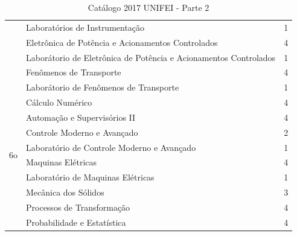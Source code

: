 \documentclass[12pt]{article} %
\begin{document}
\begin{table}[H]
\begin{tabular}{|c|l|c|}
				    & Laboratórios de Instrumentação               							& 1        \\ \cline{2-3}  
					& Eletrônica de Potência e Acionamentos Controlados   			& 4        \\ \cline{2-3} 
                      & Laborátorio de Eletrônica de Potência e Acionamentos Controlados  & 1        \\ \cline{2-3} 
                      & Fenômenos de Transporte                                    & 4        \\ \cline{2-3} 
                      & Laborátorio de Fenômenos de Transporte                                   & 1        \\ \cline{2-3} 
					& Cálculo Numérico                                                & 4        \\ \hline
\multirow{6}{*}{6o} 
				   & Automação e Supervisórios II                         & 4        \\ \cline{2-3} 
                     & Controle Moderno e Avançado                           & 2        \\ \cline{2-3} 
                     & Laboratório de Controle Moderno e Avançado                           & 1        \\ \cline{2-3}
                     & Maquinas Elétricas                           & 4        \\ \cline{2-3} 
                     & Laboratório de Maquinas Elétricas                           & 1        \\ \cline{2-3}  
                     & Mecânica dos Sólidos                                 & 3        \\ \cline{2-3} 
                     & Processos de Transformação                                   & 4        \\ \cline{2-3} 
                     & Probabilidade e Estatística                                         & 4        \\ \hline					
\end{tabular}
\caption{Catálogo 2017 UNIFEI -  Parte 2}
\label{catalago1}
\end{table}
\end{document}
